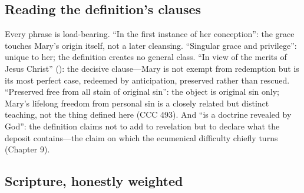 \subsection*{Reading the definition's clauses}

Every phrase is load-bearing. ``In the first instance of her
conception'': the grace touches Mary's origin itself, not a later
cleansing. ``Singular grace and privilege'': unique to her; the
definition creates no general class. ``In view of the merits of Jesus
Christ'' (): the decisive clause---Mary is not
exempt from redemption but is its most perfect case, redeemed by
anticipation, preserved rather than rescued. ``Preserved free from all
stain of original sin'': the object is original sin only; Mary's
lifelong freedom from personal sin is a closely related but distinct
teaching, not the thing defined here (CCC 493). And ``is a
doctrine revealed by God'': the definition claims not to add to
revelation but to declare what the deposit contains---the claim on which
the ecumenical difficulty chiefly turns (Chapter 9).

\subsection*{Scripture, honestly weighted}

